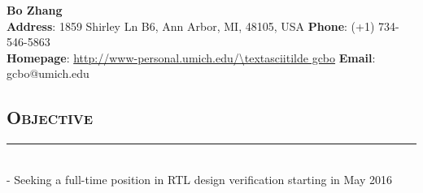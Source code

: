 \documentclass[11pt]{res}
\newcommand{\style}[1]{\color{Blue}\large\textsc{#1}}
\begin{document}
\begin{center}
\vspace{-3cm}

\textbf{\LARGE Bo Zhang}\\
\vspace{-1.0mm}
\hspace{-1.35cm}
{\indent \bf Address}: 1859 Shirley Ln B6, Ann Arbor, MI, 48105, USA \hfill {\bf Phone}: (+1) 734-546-5863\\
\vspace{-1.2mm}
\hspace{-1.35cm}
{\indent \bf Homepage}: {\color{Blue}\url{http://www-personal.umich.edu/\textasciitilde gcbo}} \hfill {\bf Email}: gcbo@umich.edu\\
\end{center}


\begin{resume}
\vspace{-35pt}
\section{\style{Objective}}
\vspace{-10pt}
\rule{18cm}{0.5mm}\\
 -\sectionwidth \resumewidth
Seeking a full-time position in RTL design verification starting in May 2016\hspace{-0.58in}
\vspace{-25pt}\\

\end{resume}
\end{document}
